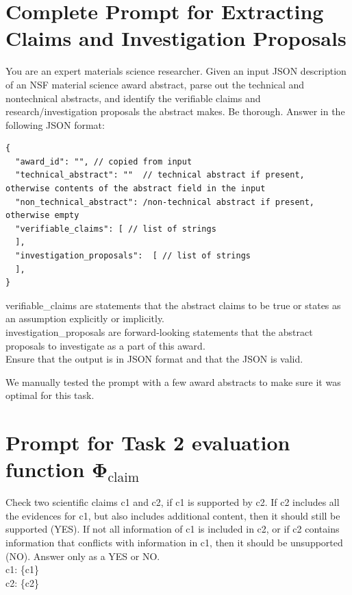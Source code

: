 \documentclass[11pt]{article}
\begin{document}
\section{Complete Prompt for Extracting Claims and Investigation Proposals}
\label{appendix:claude-claim-extraction}
\begin{mdframed}[backgroundcolor=blue!20]
\noindent You are an expert materials science researcher. Given an input JSON description of an NSF material science award abstract, parse out the technical and nontechnical abstracts, and identify the verifiable claims and research/investigation proposals the abstract makes. Be thorough. Answer in the following JSON format:
\begin{lstlisting}
{
  "award_id": "", // copied from input
  "technical_abstract": ""  // technical abstract if present, otherwise contents of the abstract field in the input
  "non_technical_abstract": /non-technical abstract if present, otherwise empty
  "verifiable_claims": [ // list of strings
  ],
  "investigation_proposals":  [ // list of strings
  ],
}    
\end{lstlisting}

\noindent verifiable\_claims are statements that the abstract claims to be true or states as an assumption explicitly or implicitly. \\
\noindent investigation\_proposals are forward-looking statements that the abstract proposals to investigate as a part of this award. \\
\noindent Ensure that the output is in JSON format and that the JSON is valid.
\end{mdframed}
We manually tested the prompt with a few award abstracts to make sure it was optimal for this task.

\section{Prompt for Task 2 evaluation function $\mathbf{\Phi}_{\textrm{claim}}$}
\label{appendix:phi_claim}
\begin{mdframed}[backgroundcolor=blue!20]
\noindent Check two scientific claims c1 and c2, if c1 is supported by c2. If c2 includes all the evidences for c1, but also includes additional content, then it should still be supported (YES). If not all information of c1 is included in c2, or if c2 contains information that conflicts with information in c1, then it should be unsupported (NO). Answer only as a YES or NO.\\
\noindent c1: \{c1\}\\
\noindent c2: \{c2\}
\end{mdframed}
\end{document}
